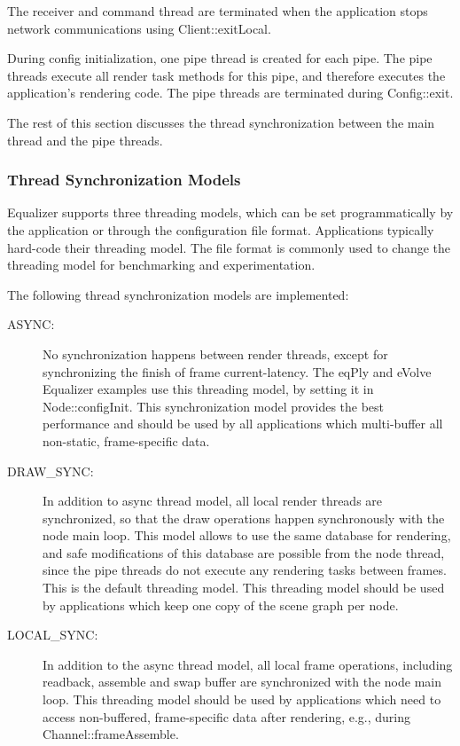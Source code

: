 \documentclass[10pt,a4]{scrartcl}
\begin{document}
The receiver and command thread are terminated when the application
stops network communications using \textsf{Client::exitLocal}.

During config initialization, one pipe thread is created for each
pipe. The pipe threads execute all render task methods for this pipe,
and therefore executes the application's rendering code. The pipe
threads are terminated during \textsf{Config::exit}.

The rest of this section discusses the thread synchronization between
the main thread and the pipe threads.


\subsubsection{\label{sThreadModel}Thread Synchronization Models}
Equalizer supports three threading models, which can be set
programmatically by the application or through the configuration file
format. Applications typically hard-code their threading model. The file
format is commonly used to change the threading model for benchmarking
and experimentation.

The following thread synchronization models are implemented:
\begin{description}
\item[ASYNC:] No synchronization happens between render threads, except
  for synchronizing the finish of frame \textsf{current-latency}. The
  \textsf{eqPly} and \textsf{eVolve} Equalizer examples use this
  threading model, by setting it in \textsf{Node::configInit}. This
  synchronization model provides the best performance and should be used
  by all applications which multi-buffer all non-static, frame-specific
  data.
\item[DRAW\_SYNC:] In addition to async thread model, all local render
  threads are synchronized, so that the draw operations happen
  synchronously with the node main loop. This model allows to use the
  same database for rendering, and safe modifications of this database
  are possible from the node thread, since the pipe threads do not
  execute any rendering tasks between frames. This is the default
  threading model. This threading model should be used by applications
  which keep one copy of the scene graph per node.
\item[LOCAL\_SYNC:] In addition to the async thread model, all local
  frame operations, including readback, assemble and swap buffer are
  synchronized with the node main loop. This threading model should be
  used by applications which need to access non-buffered, frame-specific
  data after rendering, e.g., during \textsf{Channel::frameAssemble}.
\end{description}
\end{document}
